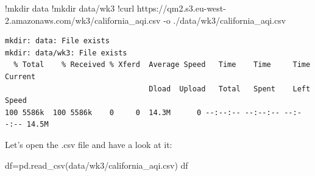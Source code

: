 \documentclass[
  letterpaper,
  DIV=11,
  numbers=noendperiod]{scrreprt}
\newenvironment{Shaded}{\begin{snugshade}}{\end{snugshade}}
\newcommand{\ErrorTok}[1]{\textcolor[rgb]{0.68,0.00,0.00}{#1}}
\newcommand{\FloatTok}[1]{\textcolor[rgb]{0.68,0.00,0.00}{#1}}
\newcommand{\NormalTok}[1]{\textcolor[rgb]{0.00,0.23,0.31}{#1}}
\newcommand{\OperatorTok}[1]{\textcolor[rgb]{0.37,0.37,0.37}{#1}}
\newcommand{\StringTok}[1]{\textcolor[rgb]{0.13,0.47,0.30}{#1}}
\begin{document}
\begin{Shaded}
\begin{Highlighting}[]
\OperatorTok{!}\NormalTok{mkdir data}
\OperatorTok{!}\NormalTok{mkdir data}\OperatorTok{/}\NormalTok{wk3}
\OperatorTok{!}\NormalTok{curl https:}\OperatorTok{//}\NormalTok{qm2.s3.eu}\OperatorTok{{-}}\NormalTok{west}\OperatorTok{{-}}\FloatTok{2.}\ErrorTok{amazonaws}\NormalTok{.com}\OperatorTok{/}\NormalTok{wk3}\OperatorTok{/}\NormalTok{california\_aqi.csv }\OperatorTok{{-}}\NormalTok{o .}\OperatorTok{/}\NormalTok{data}\OperatorTok{/}\NormalTok{wk3}\OperatorTok{/}\NormalTok{california\_aqi.csv}
\end{Highlighting}
\end{Shaded}

\begin{verbatim}
mkdir: data: File exists
mkdir: data/wk3: File exists
  % Total    % Received % Xferd  Average Speed   Time    Time     Time  Current
                                 Dload  Upload   Total   Spent    Left  Speed
100 5586k  100 5586k    0     0  14.3M      0 --:--:-- --:--:-- --:--:-- 14.5M
\end{verbatim}

Let's open the .csv file and have a look at it:

\begin{Shaded}
\begin{Highlighting}[]
\NormalTok{df}\OperatorTok{=}\NormalTok{pd.read\_csv(}\StringTok{\textquotesingle{}data/wk3/california\_aqi.csv\textquotesingle{}}\NormalTok{)}
\NormalTok{df}
\end{Highlighting}
\end{Shaded}
\end{document}
